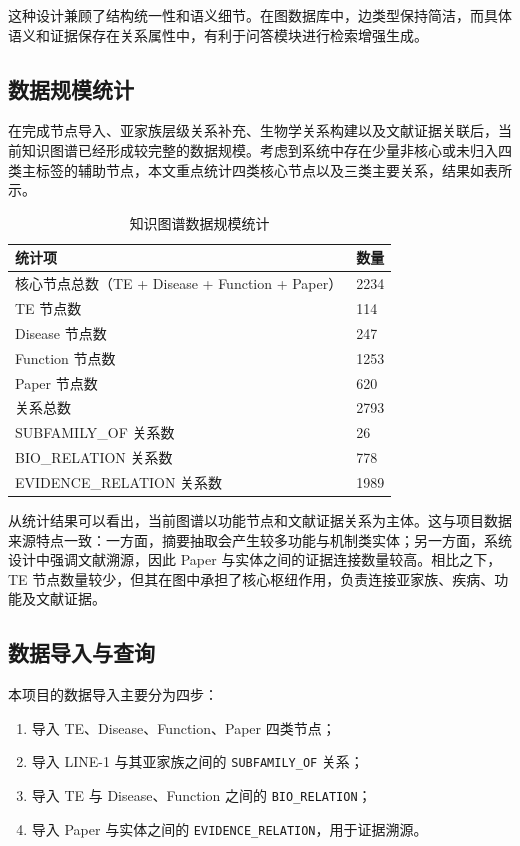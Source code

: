 这种设计兼顾了结构统一性和语义细节。在图数据库中，边类型保持简洁，而具体语义和证据保存在关系属性中，有利于问答模块进行检索增强生成。

\subsection{数据规模统计}

在完成节点导入、亚家族层级关系补充、生物学关系构建以及文献证据关联后，当前知识图谱已经形成较完整的数据规模。考虑到系统中存在少量非核心或未归入四类主标签的辅助节点，本文重点统计四类核心节点以及三类主要关系，结果如表所示。

\begin{table}[H]
  \centering
  \caption{知识图谱数据规模统计}
  \begin{tabular}{p{6cm} p{4cm}}
    \toprule
    统计项 & 数量 \\
    \midrule
    核心节点总数（TE + Disease + Function + Paper） & 2234 \\
    TE 节点数 & 114 \\
    Disease 节点数 & 247 \\
    Function 节点数 & 1253 \\
    Paper 节点数 & 620 \\
    关系总数 & 2793 \\
    SUBFAMILY\_OF 关系数 & 26 \\
    BIO\_RELATION 关系数 & 778 \\
    EVIDENCE\_RELATION 关系数 & 1989 \\
    \bottomrule
  \end{tabular}
\end{table}

从统计结果可以看出，当前图谱以功能节点和文献证据关系为主体。这与项目数据来源特点一致：一方面，摘要抽取会产生较多功能与机制类实体；另一方面，系统设计中强调文献溯源，因此 Paper 与实体之间的证据连接数量较高。相比之下，TE 节点数量较少，但其在图中承担了核心枢纽作用，负责连接亚家族、疾病、功能及文献证据。

\subsection{数据导入与查询}

本项目的数据导入主要分为四步：
\begin{enumerate}[leftmargin=2em]
  \item 导入 TE、Disease、Function、Paper 四类节点；
  \item 导入 LINE-1 与其亚家族之间的 \texttt{SUBFAMILY\_OF} 关系；
  \item 导入 TE 与 Disease、Function 之间的 \texttt{BIO\_RELATION}；
  \item 导入 Paper 与实体之间的 \texttt{EVIDENCE\_RELATION}，用于证据溯源。
\end{enumerate}

